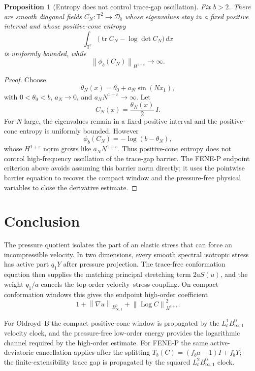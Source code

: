 \documentclass[11pt]{article}
\newtheorem{proposition}{Proposition}[section]
\newcommand{\T}{\mathbb T}
\newcommand{\Id}{I}
\newcommand{\tr}{\operatorname{tr}}
\newcommand{\Log}{\operatorname{Log}}
\newcommand{\dd}{\,dx}
\newcommand{\calD}{\mathcal D}
\newcommand{\eps}{\varepsilon}
\newcommand{\norm}[1]{\left\lVert #1\right\rVert}
\begin{document}
\begin{proposition}[Entropy does not control trace-gap oscillation]
\label{prop:barrier-independent-unified}
Fix \(b>2\).  There are smooth diagonal fields \(C_N:\T^2\to\calD_b\) whose
eigenvalues stay in a fixed positive interval and whose positive-cone entropy
\[
  \int_{\T^2}\bigl(\tr C_N-\log\det C_N\bigr)\dd
\]
is uniformly bounded, while
\[
  \norm{\phi_b(C_N)}_{H^{1+\eps}}\to\infty .
\]
\end{proposition}

\begin{proof}
Choose
\[
  \theta_N(x)=\theta_0+a_N\sin(Nx_1),
\]
with \(0<\theta_0<b\), \(a_N\to0\), and
\(a_NN^{1+\eps}\to\infty\).  Let
\[
  C_N(x)=\frac{\theta_N(x)}2\,\Id .
\]
For \(N\) large, the eigenvalues remain in a fixed positive interval and the
positive-cone entropy is uniformly bounded.  However
\[
  \phi_b(C_N)=-\log(b-\theta_N),
\]
whose \(H^{1+\eps}\) norm grows like \(a_NN^{1+\eps}\).  Thus positive-cone
entropy does not control high-frequency oscillation of the trace-gap barrier.
The FENE-P endpoint criterion above avoids assuming this barrier norm directly;
it uses the pointwise barrier equation to recover the compact window and the
pressure-free physical variables to close the derivative estimate.
\end{proof}

\section{Conclusion}

The pressure quotient isolates the part of an elastic stress that can force an
incompressible velocity.  In two dimensions, every smooth spectral isotropic
stress has active part \(q_1Y\) after pressure projection.  The trace-free
conformation equation then supplies the matching principal stretching term
\(2aS(u)\), and the weight \(q_1/a\) cancels the top-order
velocity--stress coupling.  On compact conformation windows this gives the
endpoint high-order coefficient
\[
  1+\norm{\nabla u}_{B^0_{\infty,1}}
  +\norm{\Log C}_{H^{1+\varepsilon}}^2 .
\]

For Oldroyd--B the compact positive-cone window is propagated by the
\(L^1_tB^0_{\infty,1}\) velocity clock, and the pressure-free low-order energy
provides the logarithmic channel required by the high-order estimate.  For
FENE-P the same active-deviatoric cancellation applies after the splitting
\(T_b(C)=(f_ba-1)I+f_bY\); the finite-extensibility trace gap is propagated by
the squared \(L^2_tB^0_{\infty,1}\) clock.
\end{document}
